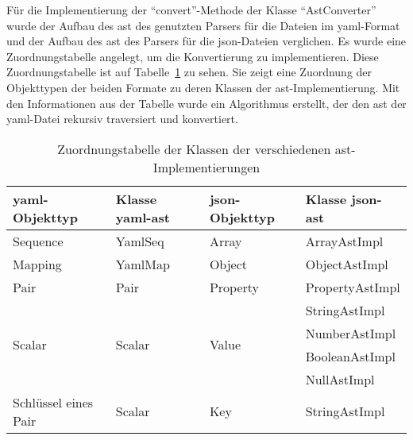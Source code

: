 Für die Implementierung der ``convert''-Methode der Klasse ``AstConverter'' wurde der Aufbau des \ac{ast} des genutzten Parsers für
die Dateien im \ac{yaml}-Format und der Aufbau des \ac{ast} des Parsers für die \ac{json}-Dateien verglichen.
Es wurde eine Zuordnungstabelle angelegt, um die Konvertierung zu implementieren.
Diese Zuordnungstabelle ist auf Tabelle~\ref{tbl:yaml-ast-to-json-ast-convert} zu sehen.
Sie zeigt eine Zuordnung der Objekttypen der beiden Formate zu deren Klassen der \ac{ast}-Implementierung.
Mit den Informationen aus der Tabelle wurde ein Algorithmus erstellt, der den \ac{ast} der \ac{yaml}-Datei rekursiv traversiert und konvertiert.

\begin{table}[htp]
      \centering
      \begin{tabular}{|l|l|l|l|}
            \hline
            \acs{yaml}-Objekttyp    & Klasse \acs{yaml}-\acs{ast} & \acs{json}-Objekttyp   & Klasse \acs{json}-\acs{ast} \\
            \hline
            \hline
            Sequence                & YamlSeq                     & Array                  & ArrayAstImpl                \\
            \hline
            Mapping                 & YamlMap                     & Object                 & ObjectAstImpl               \\
            \hline
            Pair                    & Pair                        & Property               & PropertyAstImpl             \\
            \hline
            \multirow{4}{*}{Scalar} & \multirow{4}{*}{Scalar}     & \multirow{4}{*}{Value} & StringAstImpl               \\
                                    &                             &                        & NumberAstImpl               \\
                                    &                             &                        & BooleanAstImpl              \\
                                    &                             &                        & NullAstImpl                 \\
            \hline
            Schlüssel eines Pair    & Scalar                      & Key                    & StringAstImpl               \\
            \hline
      \end{tabular}
      \caption{Zuordnungstabelle der Klassen der verschiedenen \acs{ast}-Implementierungen}
      \label{tbl:yaml-ast-to-json-ast-convert}
\end{table}

